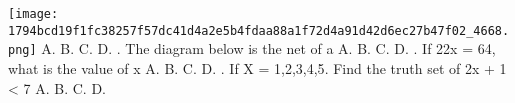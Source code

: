 \documentclass{article}
\begin{document}
\begin{multicols}{2}
  \texttt{[image: 1794bcd19f1fc38257f57dc41d4a2e5b4fdaa88a1f72d4a91d42d6ec27b47f02\_4668.png]}
 \newline \indent A. \newline \indent B. \newline \indent C. \newline \indent D.  \newline{}.  The diagram below is the net of a \newline \indent A. \newline \indent B. \newline \indent C. \newline \indent D.  \newline{}. If 22x = 64, what is the value of x \newline \indent A. \newline \indent B. \newline \indent C. \newline \indent D.  \newline{}. If X = {1,2,3,4,5}. Find the truth set of 2x + 1 < 7 \newline \indent A. \newline \indent B. \newline \indent C. \newline \indent D.  
\end{multicols}
\end{document}
